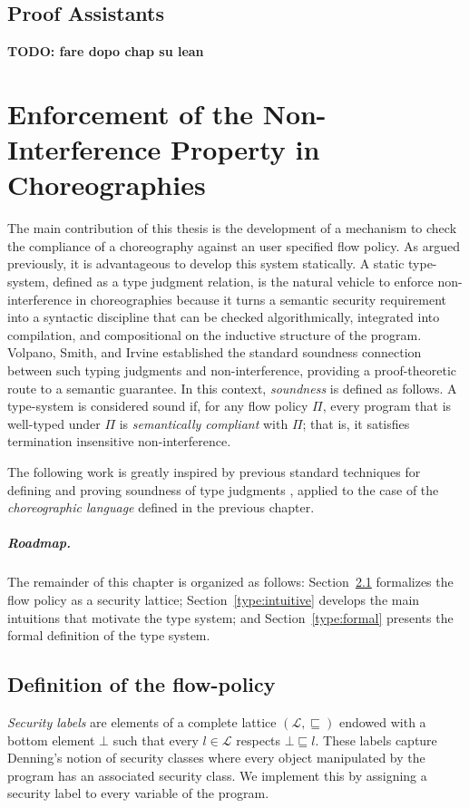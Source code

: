 \documentclass[12pt,a4paper,twoside]{book}
\begin{document}
\section{Proof Assistants}
\textbf{TODO: fare dopo chap su lean}

\chapter{Enforcement of the Non-Interference Property in Choreographies}
The main contribution of this thesis is the development of a mechanism to check the compliance of a choreography against an user specified flow policy.
As argued previously, it is advantageous to develop this system statically.
A static type-system, defined as a type judgment relation, is the natural vehicle to enforce non-interference in choreographies because it turns a semantic security requirement into a syntactic discipline that can be checked algorithmically, integrated into compilation, and compositional on the inductive structure of the program.
Volpano, Smith, and Irvine\cite{volpano1996sound} established the standard soundness connection between such typing judgments and non-interference, providing a proof-theoretic route to a semantic guarantee. In this context, \textit{soundness} is defined as follows.
A type-system is considered sound if, for any flow policy $\Pi$, every program that is well-typed under $\Pi$ is \textit{semantically compliant} with $\Pi$; that is, it satisfies termination insensitive non-interference.

The following work is greatly inspired by previous standard techniques for defining and proving soundness of type judgments \cite{myers2011proving}\cite{wright1994syntactic}, applied to the case of the \emph{choreographic language} defined in the previous chapter.

\paragraph{Roadmap.}
The remainder of this chapter is organized as follows: Section~\ref{type:flow-policy} formalizes the flow policy as a security lattice; Section~\ref{type:intuitive} develops the main intuitions that motivate the type system; and Section~\ref{type:formal} presents the formal definition of the type system.

\section{Definition of the flow-policy}
\label{type:flow-policy}
\textit{Security labels} are elements of a complete lattice $(\mathscr{L}, \sqsubseteq)$ endowed with a bottom element $\bot$ such that every $l \in \mathscr{L}$ respects $\bot \sqsubseteq l$.
These labels capture Denning's notion of security classes where every object manipulated by the program has an associated security class. We implement this by assigning a security label to every variable of the program.
\end{document}
